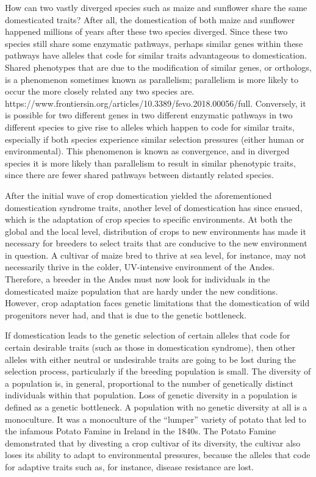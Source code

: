\documentclass[12pt]{article}
\begin{document}
How can two vastly diverged species such as maize and sunflower share the same domesticated traits? After all, the domestication of both maize and sunflower happened millions of years after these two species diverged. Since these two species still share some enzymatic pathways, perhaps similar genes within these pathways have alleles that code for similar traits advantageous to domestication. Shared phenotypes that are due to the modification of similar genes, or orthologs, is a phenomenon sometimes known as parallelism; parallelism is more likely to occur the more closely related any two species are.   https://www.frontiersin.org/articles/10.3389/fevo.2018.00056/full. Conversely, it is possible for two different genes in two different enzymatic pathways in two different species to give rise to alleles which happen to code for similar traits, especially if both species experience similar selection pressures (either human or environmental). This phenomenon is known as convergence, and in diverged species it is more likely than parallelism to result in similar phenotypic traits, since there are fewer shared pathways between distantly related species.

After the initial wave of crop domestication yielded the aforementioned domestication syndrome traits, another level of domestication has since ensued, which is the adaptation of crop species to specific environments.  At both the global and the local level, distribution of crops to new environments has made it necessary for breeders to select traits that are conducive to the new environment in question. A cultivar of maize bred to thrive at sea level, for instance, may not necessarily thrive in the colder, UV-intensive environment of the Andes.  Therefore, a breeder in the Andes must now look for individuals in the domesticated maize population that are hardy under the new conditions. However, crop adaptation faces genetic limitations that the domestication of wild progenitors never had, and that is due to the genetic bottleneck. 

If domestication leads to the genetic selection of certain alleles that code for certain desirable traits (such as those in domestication syndrome), then other alleles with either neutral or undesirable traits are going to be lost during the selection process, particularly if the breeding population is small. The diversity of a population is, in general, proportional to the number of genetically distinct individuals within that population. Loss of genetic diversity in a population is defined as a genetic bottleneck. A population with no genetic diversity at all is a monoculture. It was a monoculture of the “lumper” variety of potato that led to the infamous Potato Famine in Ireland in the 1840s.  The Potato Famine demonstrated that by divesting a crop cultivar of its diversity, the cultivar also loses its ability to adapt to environmental pressures, because the alleles that code for adaptive traits such as, for instance, disease resistance are lost.  
\end{document}
